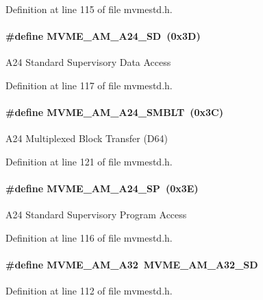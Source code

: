 Definition at line 115 of file mvmestd.h.
\paragraph[{MVME\_\-AM\_\-A24\_\-SD}]{\setlength{\rightskip}{0pt plus 5cm}\#define MVME\_\-AM\_\-A24\_\-SD~(0x3D)}\hfill\label{group__mvmestdinclude_ga660f4364bb3473787e104621504a102b}
A24 Standard Supervisory Data Access 

Definition at line 117 of file mvmestd.h.
\paragraph[{MVME\_\-AM\_\-A24\_\-SMBLT}]{\setlength{\rightskip}{0pt plus 5cm}\#define MVME\_\-AM\_\-A24\_\-SMBLT~(0x3C)}\hfill\label{group__mvmestdinclude_ga06bd96ee4af5c67cde69e923e50d463f}
A24 Multiplexed Block Transfer (D64) 

Definition at line 121 of file mvmestd.h.
\paragraph[{MVME\_\-AM\_\-A24\_\-SP}]{\setlength{\rightskip}{0pt plus 5cm}\#define MVME\_\-AM\_\-A24\_\-SP~(0x3E)}\hfill\label{group__mvmestdinclude_ga086f24604509da1e2cedd0593b3deaab}
A24 Standard Supervisory Program Access 

Definition at line 116 of file mvmestd.h.
\paragraph[{MVME\_\-AM\_\-A32}]{\setlength{\rightskip}{0pt plus 5cm}\#define MVME\_\-AM\_\-A32~MVME\_\-AM\_\-A32\_\-SD}\hfill\label{group__mvmestdinclude_gab5aa731abf25394516158c9336191f52}


Definition at line 112 of file mvmestd.h.

